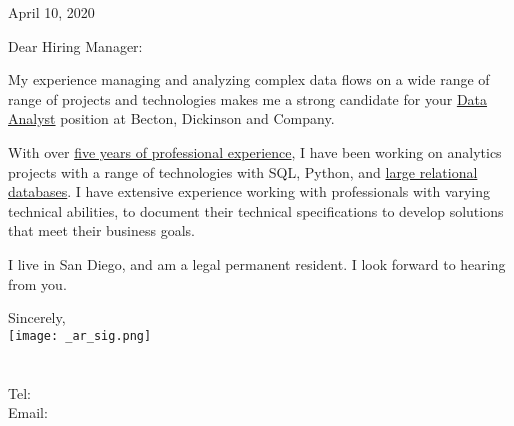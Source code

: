 \documentclass[letterpaper]{article}
\newcommand{\CVjobTitle}{Data Analyst}
\newcommand{\CVcompany}{Becton, Dickinson and Company}
\newcommand{\impt}[1]{\uline{#1}}
\begin{document}
\large

\null\hfill April 10, 2020
\vspace{1em}

Dear Hiring Manager:

My experience managing and analyzing complex data flows
on a
wide range of range of projects and technologies makes me a strong candidate for
your \impt{\CVjobTitle} position at \CVcompany.

With over \impt{five years of professional experience}, I have been working 
on analytics projects with a range of technologies
with SQL, Python,
and \impt{large relational databases}. I have extensive experience working with
professionals with varying technical abilities, to document their technical
specifications to develop solutions that meet their business goals.



I live in San Diego, and am a legal permanent resident.  
I look forward to hearing from you.  


Sincerely,\\
\hspace{1em} \texttt{[image: \_ar\_sig.png]} \\
\CVname \\
\small
\CVaddresswrap \\
Tel: \CVphone \\
Email: \CVemail
\end{document}
